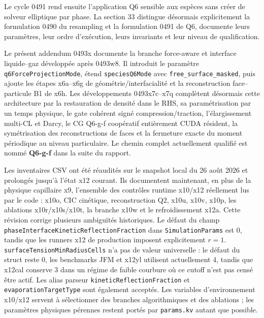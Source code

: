 \documentclass[11pt,a4paper]{article}
\begin{document}
Le cycle 0491 rend ensuite l'application Q6 sensible aux espèces sans créer de solveur elliptique par phase. La section 33 distingue désormais explicitement la formulation 0490 du resampling et la formulation 0491 de Q6, documente leurs paramètres, leur ordre d'exécution, leurs invariants et leur niveau de qualification.

Le présent addendum 0493x documente la branche force-aware et interface liquide--gaz développée après 0493w8. Il introduit le paramètre \texttt{q6ForceProjectionMode}, étend \texttt{speciesQ6Mode} avec \texttt{free\_surface\_masked}, puis ajoute les étapes x6a--x6g de géométrie/interfacialité et la reconstruction face--particule B1 de x6h. Les développements 0493x7c--x7q complètent désormais cette architecture par la restauration de densité dans le RHS, sa paramétrisation par un temps physique, le gate cohérent signé compression/traction, l'élargissement multi-CL et Darcy, le CG Q6-g-f coopératif entièrement CUDA résident, la symétrisation des reconstructions de faces et la fermeture exacte du moment périodique au niveau particulaire. Le chemin complet actuellement qualifié est nommé \textbf{Q6-g-f} dans la suite du rapport.

Les inventaires CSV ont été réaudités sur le snapshot local du 26 août 2026 et prolongés jusqu'à l'état x12 courant. Ils documentent maintenant, en plus de la physique capillaire x9, l'ensemble des contrôles runtime x10/x12 réellement lus par le code : x10o, CIC cinétique, reconstruction Q2, x10u, x10v, x10p, les ablations x10r/x10s/x10t, la branche x10w et le refroidissement x12a. Cette révision corrige plusieurs ambiguïtés historiques. Le défaut du champ \texttt{phaseInterfaceKineticReflectionFraction} dans \texttt{SimulationParams} est $0$, tandis que les runners x12 de production imposent explicitement $r=1$. \texttt{surfaceTensionMinRadiusCells} n'a pas de valeur universelle : le défaut du struct reste $0$, les benchmarks JFM et x12yl utilisent actuellement 4, tandis que x12cal conserve 3 dans un régime de faible courbure où ce cutoff n'est pas censé être actif. Les alias parseur \texttt{kineticReflectionFraction} et \texttt{evaporationTargetType} sont également acceptés. Les variables d'environnement x10/x12 servent à sélectionner des branches algorithmiques et des ablations ; les paramètres physiques pérennes restent portés par \texttt{params.kv} autant que possible.
\end{document}
